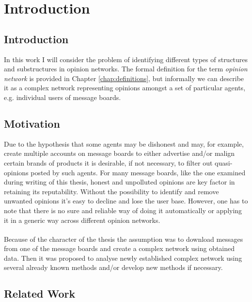 \chapter{Introduction}

	\section{Introduction}

		In this work I will consider the problem of identifying different types of structures and substructures in opinion networks. The formal definition for the term \emph{opinion network} is provided in Chapter \ref{chap:definitions}, but informally we can describe it as a complex network representing opinions amongst a set of particular agents, e.g. individual users of message boards.
		
	
	\section{Motivation}

		Due to the hypothesis that some agents may be dishonest and may, for example, create multiple accounts on message boards to either advertise and/or malign certain brands of products it is desirable, if not necessary, to filter out quasi-opinions posted by such agents. For many message boards, like the one examined during writing of this thesis, honest and unpolluted opinions are key factor in retaining its reputability. Without the possibility to identify and remove unwanted opinions it's easy to decline and lose the user base. However, one has to note that there is no sure and reliable way of doing it automatically or applying it in a generic way across different opinion networks.
		\\\\
		Because of the character of the thesis the assumption was to download messages from one of the message boards and create a complex network using obtained data. Then it was proposed to analyse newly established complex network using several already known methods and/or develop new methods if necessary.
		
	\section{Related Work}
		